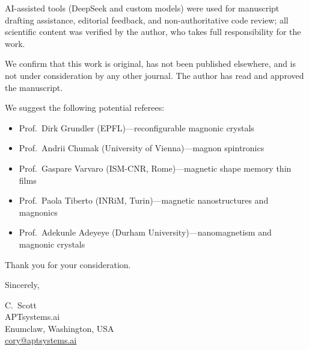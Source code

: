 \documentclass[12pt]{article}
\begin{document}
AI-assisted tools (DeepSeek and custom models) were used for manuscript drafting assistance, editorial feedback, and non-authoritative code review; all scientific content was verified by the author, who takes full responsibility for the work.

We confirm that this work is original, has not been published elsewhere, and is not under consideration by any other journal. The author has read and approved the manuscript.

We suggest the following potential referees:

\begin{itemize}
    \item Prof.\ Dirk Grundler (EPFL)---reconfigurable magnonic crystals
    \item Prof.\ Andrii Chumak (University of Vienna)---magnon spintronics
    \item Prof.\ Gaspare Varvaro (ISM-CNR, Rome)---magnetic shape memory thin films
    \item Prof.\ Paola Tiberto (INRiM, Turin)---magnetic nanostructures and magnonics
    \item Prof.\ Adekunle Adeyeye (Durham University)---nanomagnetism and magnonic crystals
\end{itemize}

Thank you for your consideration.

\bigskip

Sincerely,

\vspace{2\baselineskip}

C.\ Scott\\
APTsystems.ai\\
Enumclaw, Washington, USA\\
\href{mailto:cory@aptsystems.ai}{cory@aptsystems.ai}
\end{document}
